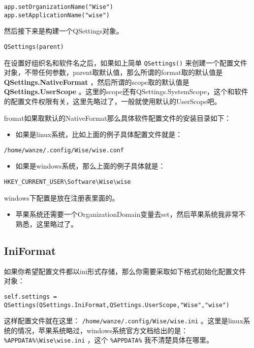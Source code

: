 \documentclass[11pt,oneside]{article}
\begin{document}
\begin{verbatim}
app.setOrganizationName("Wise")
app.setApplicationName("wise")
\end{verbatim}


然后接下来是构建一个QSettings对象。
\begin{verbatim}
QSettings(parent)
\end{verbatim}

在设置好组织名和软件名之后，如果如上简单 \texttt{QSettings()} 来创建一个配置文件对象，不带任何参数，parent取默认值，那么所谓的format取的默认值是 \textbf{QSettings.NativeFormat} ，然后所谓的scope取的默认值是 \textbf{QSettings.UserScope} 。这里的scope还有QSettings.SystemScope，这个和软件的配置文件权限有关，这里先略过了，一般就使用默认的UserScope吧。

fromat如果取默认的NativeFormat那么具体软件配置文件的安装目录如下：

\begin{itemize}
\item 如果是linux系统，比如上面的例子具体配置文件就是：
\end{itemize}
\begin{Verbatim}
/home/wanze/.config/Wise/wise.conf
\end{Verbatim}

\begin{itemize}
\item 如果是windows系统，那么上面的例子具体就是：
\end{itemize}
\begin{Verbatim}
HKEY_CURRENT_USER\Software\Wise\wise
\end{Verbatim}

windows下配置是放在注册表里面的。

\begin{itemize}
\item 苹果系统还需要一个OrganizationDomain变量去set，然后苹果系统我非常不熟悉，这里略过了。
\end{itemize}


\subsection{IniFormat}
\label{sec:orgheadline29}
如果你希望配置文件都以ini形式存储，那么你需要采取如下格式初始化配置文件对象：
\begin{Verbatim}
self.settings = QSettings(QSettings.IniFormat,QSettings.UserScope,"Wise","wise")
\end{Verbatim}

这样配置文件就在这里： \texttt{/home/wanze/.config/Wise/wise.ini} 。这里是linux系统的情况，苹果系统略过，windows系统官方文档给出的是： \texttt{\%APPDATA\%\textbackslash{}Wise\textbackslash{}wise.ini} ，这个 \texttt{\%APPDATA\%} 我不清楚具体在哪里。
\end{document}

